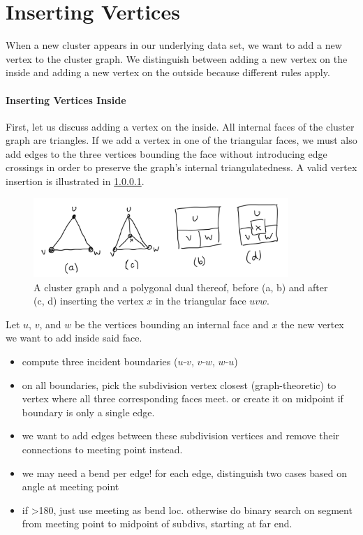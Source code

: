 \section{Inserting Vertices}
\label{sect:inserting-vertices}

When a new cluster appears in our underlying data set, we want to add a new vertex to the cluster graph. We distinguish between adding a new vertex on the inside and adding a new vertex on the outside because different rules apply.



\paragraph{Inserting Vertices Inside}

First, let us discuss adding a vertex on the inside. All internal faces of the cluster graph are triangles. If we add a vertex in one of the triangular faces, we must also add edges to the three vertices bounding the face without introducing edge crossings in order to preserve the graph's internal triangulatedness. A valid vertex insertion is illustrated in \cref{}.

\begin{figure}[H]
	\centering
	\includegraphics[height=30mm]{Resources/InsertVertexInside.png}
	\caption{A cluster graph and a polygonal dual thereof, before (a, b) and after (c, d) inserting the vertex $x$ in the triangular face $uvw$.}
	\label{fig:insert-vertex-inside-example}
\end{figure}



Let $u$, $v$, and $w$ be the vertices bounding an internal face and $x$ the new vertex we want to add inside said face.

\begin{itemize}
	\item compute three incident boundaries ($u$-$v$, $v$-$w$, $w$-$u$)
	\item on all boundaries, pick the subdivision vertex closest (graph-theoretic) to vertex where all three corresponding faces meet. or create it on midpoint if boundary is only a single edge.
	\item we want to add edges between these subdivision vertices and remove their connections to meeting point instead.
	\item we may need a bend per edge! for each edge, distinguish two cases based on angle at meeting point
	\item if >180, just use meeting as bend loc. otherwise do binary search on segment from meeting point to midpoint of subdivs, starting at far end.
\end{itemize}


